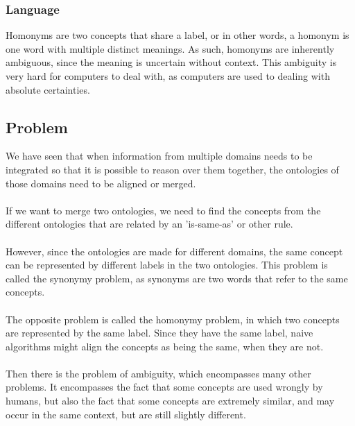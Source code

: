 \documentclass{article}
\begin{document}
  \paragraph{}
  \subsubsection{Language}
  Homonyms are two concepts that share a label, or in other words, a homonym is one word with multiple distinct meanings. As such, homonyms are inherently ambiguous, since the meaning is uncertain without context. This ambiguity is very hard for computers to deal with, as computers are used to dealing with absolute certainties.
  
 \subsection{Problem}
 We have seen that when information from multiple domains needs to be integrated so that it is possible to reason over them together, the ontologies of those domains need to be aligned or merged.
 \paragraph{}
 If we want to merge two ontologies, we need to find the concepts from the different ontologies that are related by an 'is-same-as' or other rule.
 \paragraph{}
 However, since the ontologies are made for different domains, the same concept can be represented by different labels in the two ontologies. This problem is called the synonymy problem, as synonyms are two words that refer to the same concepts.
 \paragraph{}
 The opposite problem is called the homonymy problem, in which two concepts are represented by the same label. Since they have the same label, naive algorithms might align the concepts as being the same, when they are not.
 \paragraph{}
 Then there is the problem of ambiguity, which encompasses many other problems. It encompasses the fact that some concepts are used wrongly by humans, but also the fact that some concepts are extremely similar, and may occur in the same context, but are still slightly different.
\end{document}
